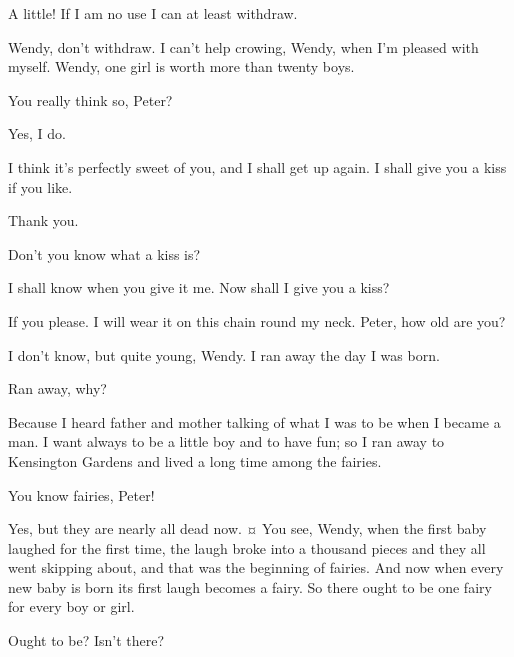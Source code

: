 \begin{drama}
A little!
If I am no use I can at least withdraw.


\peterspeaks
Wendy, don’t withdraw.
I can’t help crowing, Wendy, when I’m pleased with myself.
Wendy, one girl is worth more than twenty boys.

You really think so, Peter?

\peterspeaks
Yes, I do.

\wendyspeaks
I think it’s perfectly sweet of you, and I shall get up again.
I shall give you a kiss if you like.

\peterspeaks
Thank you.

Don’t you know what a kiss is?

\peterspeaks
I shall know when you give it me.
Now shall I give you a kiss?

If you please.
I will wear it on this chain round my neck.
Peter, how old are you?

I don’t know, but quite young, Wendy.
I ran away the day I was born.

\wendyspeaks
Ran away, why?

\peterspeaks
Because I heard father and mother talking of what I was to be when I became a man.
I want always to be a little boy and to have fun;
so I ran away to Kensington Gardens and lived a long time among the fairies.

You know fairies, Peter!

Yes, but they are nearly all dead now.
¤
You see, Wendy, when the first baby laughed for the first time,
the laugh broke into a thousand pieces and they all went skipping about,
and that was the beginning of fairies.
And now when every new baby is born its first laugh becomes a fairy.
So there ought to be one fairy for every boy or girl.

Ought to be?
Isn’t there?


\end{drama}
